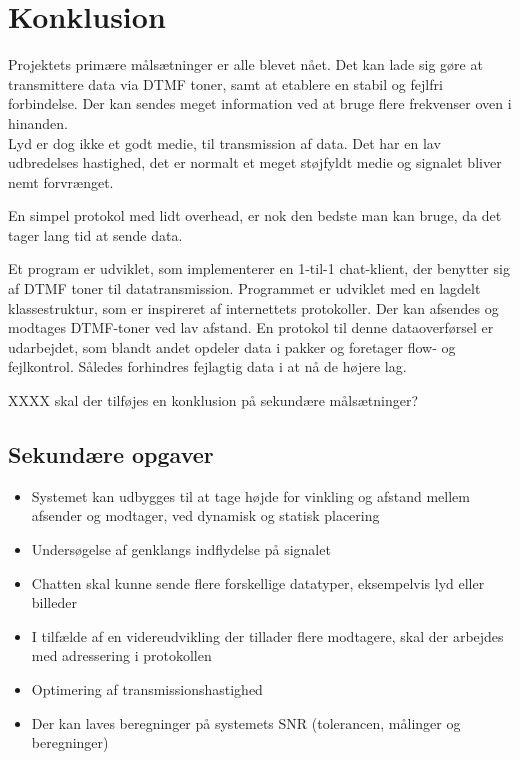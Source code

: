 \section{Konklusion}
Projektets primære målsætninger er alle blevet nået.
Det kan lade sig gøre at transmittere data via DTMF toner, samt at etablere en stabil og fejlfri forbindelse. Der kan sendes meget information ved at bruge flere frekvenser oven i hinanden.\\
Lyd er dog ikke et godt medie, til transmission af data. Det har en lav udbredelses hastighed, det er normalt et meget støjfyldt medie og signalet bliver nemt forvrænget.

En simpel protokol med lidt overhead, er nok den bedste man kan bruge, da det tager lang tid at sende data. %





Et program er udviklet, som implementerer en 1-til-1 chat-klient, der benytter sig af DTMF toner til datatransmission. Programmet er udviklet med en lagdelt klassestruktur, som er inspireret af internettets protokoller. Der kan afsendes og modtages DTMF-toner ved lav afstand. En protokol til denne dataoverførsel er udarbejdet, som blandt andet opdeler data i pakker og foretager flow- og fejlkontrol. Således forhindres fejlagtig data i at nå de højere lag.









XXXX skal der tilføjes en konklusion på sekundære målsætninger?
\subsection{Sekundære opgaver}
\begin{itemize}[noitemsep]
\item Systemet kan udbygges til at tage højde for vinkling og afstand mellem afsender og modtager, ved dynamisk og statisk placering
\item Undersøgelse af genklangs indflydelse på signalet
\item Chatten skal kunne sende flere forskellige datatyper, eksempelvis lyd eller billeder
\item I tilfælde af en videreudvikling der tillader flere modtagere, skal der arbejdes med adressering i protokollen
\item Optimering af transmissionshastighed
\item Der kan laves beregninger på systemets SNR (tolerancen, målinger og beregninger)
\end{itemize}